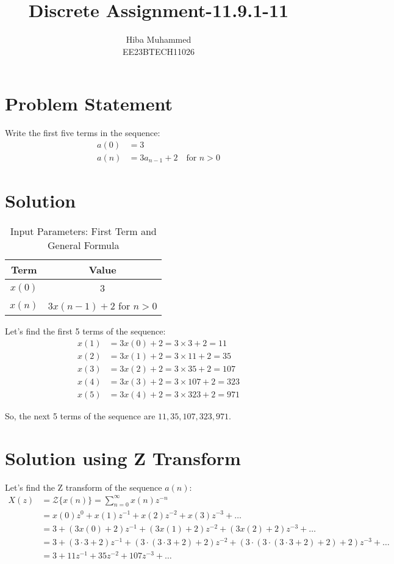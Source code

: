 \documentclass[12pt]{article}
\begin{document}
\title{Discrete Assignment-11.9.1-11}
\author{Hiba Muhammed \\
        EE23BTECH11026}
\maketitle

\section*{Problem Statement}
Write the first five terms in the sequence:
\[
\begin{aligned}
a(0)  &= 3 \\
a(n)  &= 3a_{n-1} + 2 \quad \text{for } n > 0
\end{aligned}
\]

\section*{Solution}
\begin{table}[h]
  \centering
  \caption{Input Parameters: First Term and General Formula}
  \begin{tabular}{|c|c|}
    \hline
    \textbf{Term} & \textbf{Value} \\
    \hline
    \(x(0) \) & 3 \\
    \(x(n)\) & \(3x(n-1) + 2\) for \(n > 0\) \\
    \hline
  \end{tabular}
\end{table}
Let's find the first 5 terms of the sequence:
\begin{align}
x(1) &= 3x(0)  + 2 = 3 \times 3 + 2 = 11 \\
x(2) &= 3x(1) + 2 = 3 \times 11 + 2 = 35 \\
x(3) &= 3x(2) + 2 = 3 \times 35 + 2 = 107 \\
x(4) &= 3x(3) + 2 = 3 \times 107 + 2 = 323 \\
x(5) &= 3x(4) + 2 = 3 \times 323 + 2 = 971 
\end{align}

So, the next 5 terms of the sequence are \(11, 35, 107, 323, 971\).



\section*{Solution using Z Transform}
Let's find the Z transform of the sequence \(a(n)\):
\begin{align*}
X(z) &= \mathcal{Z}\{x(n)\} = \sum_{n=0}^{\infty} x(n)z^{-n} \\
&= x(0)z^0 + x(1)z^{-1} + x(2)z^{-2} + x(3)z^{-3} + \ldots \\
&= 3 + (3x(0) + 2)z^{-1} + (3x(1) + 2)z^{-2} + (3x(2) + 2)z^{-3} + \ldots \\
&= 3 + (3 \cdot 3 + 2)z^{-1} + (3 \cdot (3 \cdot 3 + 2) + 2)z^{-2} + (3 \cdot (3 \cdot (3 \cdot 3 + 2) + 2) + 2)z^{-3} + \ldots \\
&= 3 + 11z^{-1} + 35z^{-2} + 107z^{-3} + \ldots
\end{align*}
\end{document}
